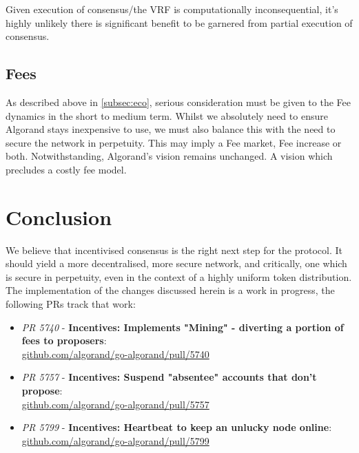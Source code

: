 \documentclass[11pt,a4paper]{article}
\begin{document}
Given execution of consensus/the VRF is computationally inconsequential, it's highly unlikely there is significant 
benefit to be garnered from partial execution of consensus.


\pagebreak

\subsection{Fees}
As described above in \ref{subsec:eco}, serious consideration must be given to the Fee dynamics in the short to medium 
term. Whilst we absolutely need to ensure Algorand stays inexpensive to use, we must also balance this with the need
to secure the network in perpetuity. This may imply a Fee market, Fee increase or both. Notwithstanding, Algorand's 
vision remains unchanged. A vision which precludes a costly fee model.

\pagebreak

\section{Conclusion}
We believe that incentivised consensus is the right next step for the protocol. It should yield a more decentralised,  
more secure network, and critically, one which is secure in perpetuity, even in the context of a highly uniform token
distribution. \\ 

The implementation of the changes discussed herein is a work in progress, the following PRs track that work:

\begin{itemize}
    \item \emph{PR 5740} - \textbf{Incentives: Implements "Mining" - diverting a portion of fees to proposers}:\\
          \href{https://github.com/algorand/go-algorand/pull/5740}{github.com/algorand/go-algorand/pull/5740} \\
    \item \emph{PR 5757} - \textbf{Incentives: Suspend "absentee" accounts that don't propose}:\\
          \href{https://github.com/algorand/go-algorand/pull/5757}{github.com/algorand/go-algorand/pull/5757} \\
    \item \emph{PR 5799} - \textbf{Incentives: Heartbeat to keep an unlucky node online}:\\
          \href{https://github.com/algorand/go-algorand/pull/5799}{github.com/algorand/go-algorand/pull/5799}
\end{itemize}

\pagebreak

\printglossaries

\pagebreak
\end{document}
